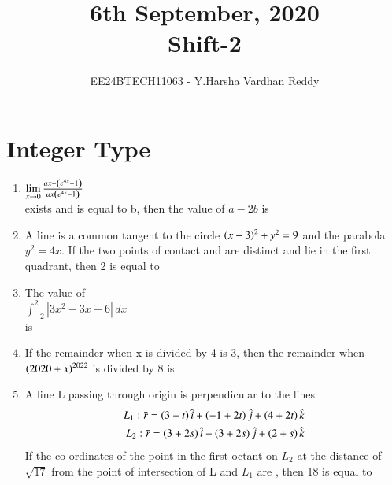 \documentclass[journal,,12pt,onecolumn]{IEEEtran}
\theoremstyle{remark}
\begin{document}

\vspace{3cm}

\title{6th September, 2020\\Shift-2}
\author{EE24BTECH11063 - Y.Harsha Vardhan Reddy}
\maketitle

\bigskip

\renewcommand{\thefigure}{\theenumi}
\renewcommand{\thetable}{\theenumi}


\section*{Integer Type}
\begin{enumerate}
 \item $\lim \limits_{x\to 0} \frac{ax-\left(e^{4x}-1\right)}{ax\left(e^{4x}-1\right)} $\\
 exists and is equal to b, then the value of $a-2b$ is
 \item A line is a common tangent to the circle $\left(x-3\right)^2+y^2=9$ and the parabola $y^2=4x$. If the two points of contact  and  are distinct and lie in the first quadrant, then 2 is equal to
 \item The value of \\
 $\int_{-2}^{2} |3x^2-3x-6| \, dx$\\
 is
 \item If the remainder when x is divided by 4 is 3, then the remainder when $\left(2020+x\right)^{2022}$ is divided by 8 is

 \item A line L passing through origin is perpendicular to the lines 
 \begin{align*}
     L_1:\Bar{r}=\left(3+t\right)\hat{i}+\left(-1+2t\right)\hat{j}+\left(4+2t\right)\hat{k}\\
     L_2:\Bar{r}=\left(3+2s\right)\hat{i}+\left(3+2s\right)\hat{j}+\left(2+s\right)\hat{k}
 \end{align*}
 If the co-ordinates of the point in the first octant on $L_2$ at the distance of $\sqrt{17}$ from the point of intersection of L and $L_1$ are , then 18 is equal to
 \end{enumerate}
 
\end{document}
